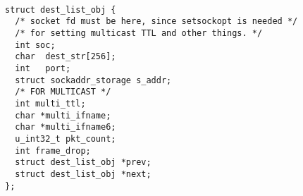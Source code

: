 \begin{verbatim}

struct dest_list_obj {
  /* socket fd must be here, since setsockopt is needed */
  /* for setting multicast TTL and other things. */
  int soc;
  char  dest_str[256];
  int   port;
  struct sockaddr_storage s_addr;
  /* FOR MULTICAST */
  int multi_ttl;
  char *multi_ifname;
  char *multi_ifname6;
  u_int32_t	pkt_count;
  int frame_drop;
  struct dest_list_obj *prev;
  struct dest_list_obj *next;
};

\end{verbatim}
